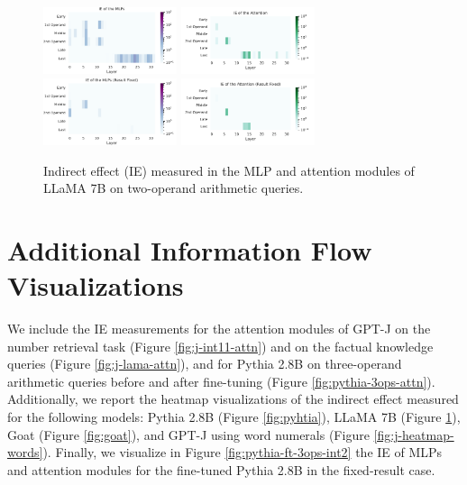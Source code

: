 \documentclass[11pt]{article}
\begin{document}
\begin{figure}[ht]
    \centering
    \includegraphics[width=0.35\textwidth]{img/llama/llama-mlp.pdf}
    \includegraphics[width=0.35\textwidth]{img/llama/llama-attn.pdf}
    \includegraphics[width=0.35\textwidth]{img/llama/llama-mlp-int2.pdf}
    \includegraphics[width=0.35\textwidth]{img/llama/llama-attn-int2.pdf}
    \caption{Indirect effect (IE) measured in the MLP and attention modules of LLaMA 7B on two-operand arithmetic queries.}
    \label{fig:llama}
\end{figure}


\section{Additional Information Flow Visualizations}
\label{sec:additional_res}

We include the IE measurements for the attention modules of GPT-J on the number retrieval task (Figure \ref{fig:j-int11-attn}) and on the factual knowledge queries (Figure \ref{fig:j-lama-attn}), and for Pythia 2.8B on three-operand arithmetic queries before and after fine-tuning (Figure \ref{fig:pythia-3ops-attn}).
Additionally, we report the heatmap visualizations of the indirect effect measured for the following models: Pythia 2.8B (Figure \ref{fig:pyhtia}), LLaMA 7B (Figure \ref{fig:llama}), Goat (Figure \ref{fig:goat}), and GPT-J using word numerals (Figure \ref{fig:j-heatmap-words}). Finally, we visualize in Figure \ref{fig:pythia-ft-3ops-int2} the IE of MLPs and attention modules for the fine-tuned Pythia 2.8B in the fixed-result case.
\end{document}
